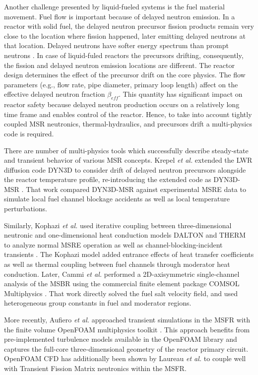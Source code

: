 Another challenge presented by liquid-fueled systems is the fuel material movement. Fuel flow is important because of delayed neutron emission. In a reactor with solid fuel, the delayed neutron precursor fission products remain very close to the location where fission happened, later emitting delayed neutrons at that location. Delayed neutrons have softer energy spectrum than prompt neutrons \cite{betzler_molten_2017}. In case of liquid-fuled reactors the precursors drifting, consequently, the fission and delayed neutron emission locations are different. The reactor design determines the effect of the precursor drift on the core physics. The flow parameters (e.g., flow rate, pipe diameter, primary loop length) affect on the effective delayed neutron fraction $\beta_{eff}$. This quantity has significant impact on reactor safety because delayed neutron production occurs on a relatively long time frame and enables control of the reactor. Hence, to take into account tightly coupled \gls{MSR} neutronics, thermal-hydraulics, and precursors drift a multi-physics code is required.

There are number of multi-physics tools which successfully describe steady-state and transient behavior of various \gls{MSR} concepts. Krepel \emph{et al.} extended the \gls{LWR} diffusion code DYN3D to consider drift of delayed neutron precursors alongside the reactor temperature profile, re-introducing the extended code as DYN3D-MSR \cite{krepel_dyn3d-msr_2007}. That work compared DYN3D-MSR against experimental \gls{MSRE} data to simulate local fuel channel blockage accidents as well as local temperature perturbations.

Similarly, Kophazi \emph{et al.} used iterative coupling between three-dimensional neutronic and one-dimensional heat conduction models DALTON and THERM to analyze normal \gls{MSRE} operation as well as channel-blocking-incident transients \cite{kophazi_development_2009}. The Kophazi model added entrance effects of heat transfer coefficients as well as thermal coupling between fuel channels through moderator heat conduction. Later, Cammi \emph{et al.} performed a 2D-axisymmetric single-channel analysis of the \gls{MSBR} using the commercial finite element package COMSOL Multiphysics \cite{cammi_multi-physics_2011}. That work directly solved the fuel salt velocity field, and used heterogeneous group constants in fuel and moderator regions.  

More recently, Aufiero \emph{et al.} \cite{aufiero_development_2014} approached transient simulations in the \gls{MSFR} with the finite volume OpenFOAM multiphysics toolkit \cite{weller_tensorial_1998}.  This approach benefits from pre-implemented turbulence models available in the OpenFOAM library and captures the full-core three-dimensional geometry of the reactor primary circuit.  OpenFOAM \gls{CFD} has additionally been shown by Laureau \emph{et al.} \cite{laureau_transient_2017} to couple well with Transient Fission Matrix neutronics within the \gls{MSFR}.

